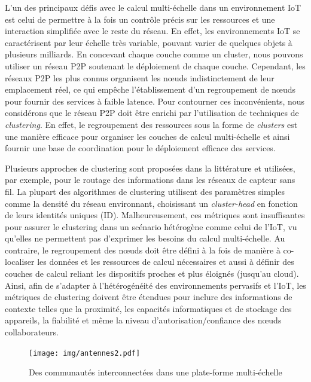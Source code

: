 L'un des principaux défis avec le calcul multi-échelle dans un environnement IoT est celui de permettre à la fois un contrôle précis sur les ressources et une interaction simplifiée avec le reste du réseau. En effet, les environnements IoT se caractérisent par leur échelle très variable, pouvant varier de quelques objets à plusieurs milliards. En concevant chaque couche comme un cluster, nous pouvons utiliser un réseau P2P soutenant le déploiement de chaque couche. Cependant, les réseaux P2P les plus connus organisent les n\oe{}uds indistinctement de leur emplacement réel, ce qui empêche l'établissement d'un regroupement de n\oe{}uds pour fournir des services à faible latence. Pour contourner ces inconvénients, nous considérons que le réseau P2P doit être enrichi par l'utilisation de techniques de \textit{clustering}. En effet, le regroupement des ressources sous la forme de \textit{clusters} est une manière efficace pour organiser les couches de calcul multi-échelle et ainsi fournir une base de coordination pour le déploiement efficace des services.

Plusieurs approches de clustering sont proposées dans la littérature \cite{Johnen2011} et utilisées, par exemple, pour  le routage des informations dans les réseaux de capteur sans fil. La plupart des algorithmes de clustering utilisent des paramètres simples comme la densité du réseau environnant, choisissant un \textit{cluster-head} en fonction de leurs identités uniques (ID). Malheureusement, ces métriques sont insuffisantes pour assurer le clustering dans un scénario hétérogène comme celui de l'IoT, vu qu'elles ne permettent pas d'exprimer les besoins du calcul multi-échelle. Au contraire, le regroupement des n\oe{}uds doit être défini à la fois de manière à co-localiser les données et les ressources de calcul nécessaires et aussi à définir des couches de calcul reliant les dispositifs proches et plus éloignés (jusqu'au cloud). Ainsi, afin de s'adapter à l'hétérogénéité des environnements pervasifs et l'IoT, les métriques de clustering doivent être étendues pour inclure des informations de contexte telles que la proximité, les capacités informatiques et de stockage des appareils, la fiabilité et même la niveau d'autorisation/confiance des n\oe{}uds collaborateurs.
 
 
 \begin{figure}[!ht]
 	\centering
 	\texttt{[image: img/antennes2.pdf]}
 	\caption{Des communautés interconnectées dans une plate-forme multi-échelle}
 	\label{fig:antennes}
 \end{figure}

